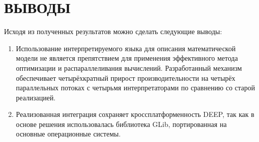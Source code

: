 \chapter*{ВЫВОДЫ}

Исходя из полученных результатов
можно сделать следующие выводы:
\bigskip

\begin{enumerate}
    \item Использование интерпретируемого языка
    для описания математической модели
    не является препятствием для применения
    эффективного метода оптимизации
    и распараллеливания вычислений.
    Разработанный механизм обеспечивает
    четырёхкратный прирост производительности
    на четырёх параллельных потоках
    с четырьмя интерпретаторами
    по сравнению со старой реализацией.

    \item Реализованная интеграция
    сохраняет кроссплатформенность DEEP,
    так как в основе решения
    использовалась библиотека GLib,
    портированная на основные операционные системы.

\end{enumerate}

